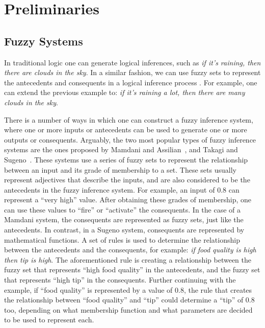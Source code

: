 \section{Preliminaries}
\label{section:preliminaries}

\subsection{Fuzzy Systems}
\label{subsection:fuzzy-systems}

In traditional logic one can generate logical inferences, such as
\textit{if it's raining, then there are clouds in the sky}. In a
similar fashion, we can use fuzzy sets to represent the antecedents
and consequents in a logical inference process
\cite{kruse1994foundations}. For example, one can extend the previous
example to: \textit{if it's raining a lot, then there are many clouds
in the sky}.

There is a number of ways in which one can construct a fuzzy inference
system, where one or more inputs or antecedents can be used to
generate one or more outputs or consequents. Arguably, the two most
popular types of fuzzy inference systems are the ones proposed by
Mamdani and Assilian~\cite{Mamdani1975}, and Takagi and
Sugeno~\cite{Takagi1985}. These systems use a series of fuzzy sets to
represent the relationship between an input and its grade of
membership to a set. These sets usually represent adjectives that
describe the inputs, and are also considered to be the antecedents in
the fuzzy inference system. For example, an input of 0.8 can represent
a ``very high'' value. After obtaining these grades of membership, one
can use these values to ``fire'' or ``activate'' the consequents. In
the case of a Mamdani system, the consequents are represented as fuzzy
sets, just like the antecedents. In contrast, in a Sugeno system,
consequents are represented by mathematical functions. A set of rules
is used to determine the relationship between the antecedents and the
consequents, for example: \textit{if food quality is high then tip is
high}. The aforementioned rule is creating a relationship between the
fuzzy set that represents ``high food quality'' in the antecedents,
and the fuzzy set that represents ``high tip'' in the
consequents. Further continuing with the example, if ``food quality''
is represented by a value of 0.8, the rule that creates the
relationship between ``food quality'' and ``tip'' could determine a
``tip'' of 0.8 too, depending on what membership function and what
parameters are decided to be used to represent each.

